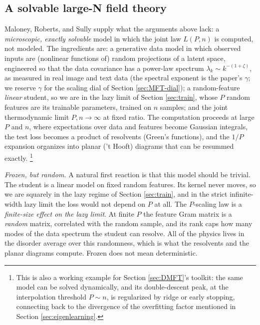 \documentclass[11pt]{article}
\begin{document}
\subsection{A solvable large-N field theory}
\label{sec:MRS}

Maloney, Roberts, and Sully \cite{maloney2022solvable} supply what the arguments above lack: a \emph{microscopic, exactly solvable} model in which the joint law $L(P,n)$ is computed, not modeled. The ingredients are: a generative data model in which observed inputs are (nonlinear functions of) random projections of a latent space, engineered so that the data covariance has a power-law spectrum $\lambda_k \sim k^{-(1+\zeta)}$, as measured in real image and text data (the spectral exponent is the paper's $\gamma$; we reserve $\gamma$ for the scaling dial of Section \ref{sec:MFT-dial}); a random-feature \emph{linear} student, so we are in the lazy limit of Section \ref{sec:train}, whose $P$ random features are its trainable parameters, trained on $n$ samples; and the joint thermodynamic limit $P,n\to\infty$ at fixed ratio. The computation proceeds at large $P$ and $n$, where expectations over data and features become Gaussian integrals, the test loss becomes a product of resolvents (Green's functions), and the $1/P$ expansion organizes into planar ('t Hooft) diagrams that can be resummed exactly.%
%
\footnote{This is also a working example for Section \ref{sec:DMFT}'s toolkit: the same model can be solved dynamically, and its double-descent peak, at the interpolation threshold $P\sim n$, is regularized by ridge or early stopping, connecting back to the divergence of the overfitting factor mentioned in Section \ref{sec:eigenlearning}.}

\emph{Frozen, but random.} A natural first reaction is that this model should be trivial. The student is a linear model on fixed random features. Its kernel never moves, so we are squarely in the lazy regime of Section \ref{sec:train}, and in the strict infinite-width lazy limit the loss would not depend on $P$ at all. The $P$-scaling law is a \emph{finite-size effect on the lazy limit}. At finite $P$ the feature Gram matrix is a \emph{random} matrix, correlated with the random sample, and its rank caps how many modes of the data spectrum the student can resolve. All of the physics lives in the disorder average over this randomness, which is what the resolvents and the planar diagrams compute. Frozen does not mean deterministic.
\end{document}
